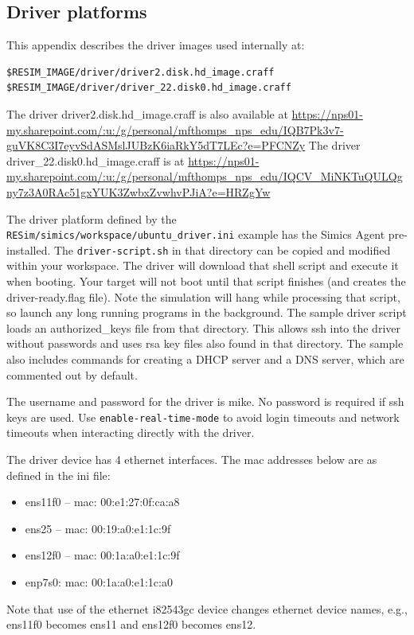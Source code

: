\documentclass[titlepage]{article}
\begin{document}
\begin{appendices}
\section{Driver platforms}
\label{driver}
This appendix describes the driver images used internally at:
\begin{verbatim}
$RESIM_IMAGE/driver/driver2.disk.hd_image.craff
$RESIM_IMAGE/driver/driver_22.disk0.hd_image.craff
\end{verbatim}
The driver driver2.disk.hd\_image.craff is also available at \url{https://nps01-my.sharepoint.com/:u:/g/personal/mfthomps\_nps\_edu/IQB7Pk3v7-guVK8C3I7eyvSdASMslJUBzK6iaRkY5dT7LEc?e=PFCNZy}
The driver driver\_22.disk0.hd\_image.craff is at  \url{https://nps01-my.sharepoint.com/:u:/g/personal/mfthomps\_nps\_edu/IQCV\_MiNKTuQULQgny7z3A0RAc51gxYUK3ZwbxZvwhvPJiA?e=HRZgYw}

The driver platform defined by the {\tt RESim/simics/workspace/ubuntu\_driver.ini} example has the Simics Agent pre-installed.  The
{\tt driver-script.sh} in that directory can be copied and modified within your workspace.  The driver will download that shell script and execute
it when booting.  Your target will not boot until that script finishes (and creates the driver-ready.flag file).
Note the simulation will hang while processing that script, so launch any long running programs in the background.
The sample driver script loads an authorized\_keys file from that directory.  This allows ssh into the driver without passwords and uses
rsa key files also found in that directory.  The sample also includes commands for creating a DHCP server and a DNS server, which are commented out by default.

The username and password for the driver is mike. No password is required if ssh keys are used.  Use {\tt enable-real-time-mode} to avoid login timeouts and network timeouts when
interacting directly with the driver.  

The driver device has 4 ethernet interfaces.  The mac addresses below are as defined in the ini file:
\begin{itemize}
\item ens11f0 -- mac: 00:e1:27:0f:ca:a8
\item ens25 -- mac: 00:19:a0:e1:1c:9f
\item ens12f0 -- mac: 00:1a:a0:e1:1c:9f
\item enp7s0:  mac: 00:1a:a0:e1:1c:a0 
\end{itemize}
Note that use of the ethernet i82543gc device changes ethernet device names, e.g., ens11f0 becomes ens11 and ens12f0 becomes ens12.


\end{appendices}
\end{document}
